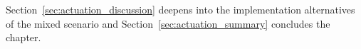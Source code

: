 Section~\ref{sec:actuation_discussion} deepens into the implementation alternatives of the mixed scenario
and Section~\ref{sec:actuation_summary} concludes the chapter.










